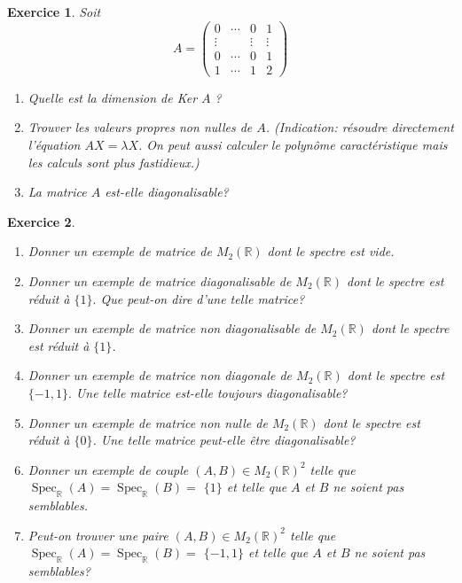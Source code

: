 \documentclass[12pt,a4paper]{article}
\theoremstyle{break}
\theoremstyle{break}
\newtheorem{Exo}{Exercice}
\begin{document}
\begin{Exo}
	Soit
	$$
	A=\left(\begin{array}{cccc}
		0 & \cdots & 0 & 1 \\
		\vdots & & \vdots & \vdots \\
		0 & \cdots & 0 & 1 \\
		1 & \cdots & 1 & 2
	\end{array}\right)
	$$
\begin{enumerate}
	\item
	Quelle est la dimension de Ker $A$ ?
	\item
	Trouver les valeurs propres non nulles de $A$. (Indication: résoudre directement l'équation $A X=\lambda X$. On peut aussi calculer le polynôme caractéristique mais les calculs sont plus fastidieux.)
	\item
	La matrice $A$ est-elle diagonalisable?
\end{enumerate}
\end{Exo}

\begin{Exo}\ 
	
	\begin{enumerate}
		\item
		Donner un exemple de matrice de ${M}_{2}(\mathbb{R})$ dont le spectre est vide.
		\item
		Donner un exemple de matrice diagonalisable de ${M}_{2}(\mathbb{R})$ dont le spectre est réduit à $\{1\} .$ Que peut-on dire d'une telle matrice?
		\item
		Donner un exemple de matrice non diagonalisable de ${M}_{2}(\mathbb{R})$ dont le spectre est réduit à $\{1\}$.
		\item
		Donner un exemple de matrice non diagonale de ${M}_{2}(\mathbb{R})$ dont le spectre est $\{-1,1\} .$ Une telle matrice est-elle toujours diagonalisable?
		\item
		Donner un exemple de matrice non nulle de ${M}_{2}(\mathbb{R})$ dont le spectre est réduit à $\{0\}$. Une telle matrice peut-elle être diagonalisable?
		\item
		Donner un exemple de couple $(A, B) \in {M}_{2}(\mathbb{R})^{2}$ telle que $\operatorname{Spec}_{\mathbb{R}}(A)=\operatorname{Spec}_{\mathbb{R}}(B)=$ $\{1\}$ et telle que $A$ et $B$ ne soient pas semblables.
		\item
		Peut-on trouver une paire $(A, B) \in {M}_{2}(\mathbb{R})^{2}$ telle que $\operatorname{Spec}_{\mathbb{R}}(A)=\operatorname{Spec}_{\mathbb{R}}(B)=$ $\{-1,1\}$ et telle que $A$ et $B$ ne soient pas semblables?
	\end{enumerate}
\end{Exo}
\end{document}
